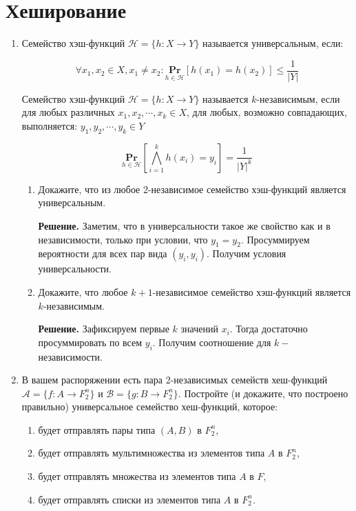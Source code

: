 \section{Хеширование}
\begin{enumerate}
	\item Семейство хэш-функций $\mathcal{H} = \{h : X \rightarrow Y \}$ называется универсальным, если:
	
	\begin{equation*}
	\forall x_1, x_2 \in X, x_1 \neq x_2 : \underset{h \in \mathcal{H}}{\mathbf{Pr}} \left[h(x_1) = h(x_2)\right] 
	\leqslant \frac{1}{|Y|}
	\end{equation*}
	
	Семейство хэш-функций $\mathcal{H} = \{h : X \rightarrow Y \}$ называется $k$-независимым, если для любых 
	различных $x_1, x_2, \cdots , x_k \in X$, для любых, возможно совпадающих, выполняется: $y_1, y_2, \cdots, 
	y_k \in Y$
	
	\begin{equation*}
	 \underset{h \in \mathcal{H}}{\mathbf{Pr}} \left[\bigwedge\limits_{i = 1}^{k} h(x_i) = y_i\right] = 
	 \frac{1}{|Y|^k}
	\end{equation*}
		
	\begin{enumerate}
		\item Докажите, что из любое 2-независимое семейство хэш-функций является универсальным.
		
		\textbf{Решение.} Заметим, что в универсальности такое же свойство как и в независимости, только при 
		условии, что $y_1 = y_2$. Просуммируем вероятности для всех пар вида $(y_i, y_i)$. Получим условия 
		универсальности.
		
		\item Докажите, что любое $k + 1$-независимое семейство хэш-функций является $k$-независимым.
		
		\textbf{Решение.} Зафиксируем первые $k$ значений $x_i$. Тогда достаточно просуммировать по всем $y_i$. Получим соотношение для $k-$ независимости.
		
	\end{enumerate}
	
	\item В вашем распоряжении есть пара 2-независимых семейств хеш-функций $\mathcal{A} = \{f : A \rightarrow 
	F_2^n \}$ и $\mathcal{B} = \{g : B \rightarrow F_2^n \}$. Постройте (и докажите, что построено правильно) 
	универсальное семейство хеш-функций, которое:
	\begin{enumerate}
		\item будет отправлять пары типа $(A, B)$ в $F_2^n$,
		\item будет отправлять мультимножества из элементов типа $A$ в $F_2^n$,
		\item будет отправлять множества из элементов типа $A$ в $F$,
		\item будет отправлять списки из элементов типа $A$ в $F_2^n$.
	\end{enumerate}
	

\end{enumerate}
